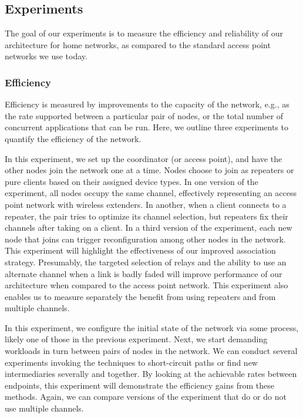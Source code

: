 \subsection{Experiments}
The goal of our experiments is to measure the efficiency and reliability of our architecture for home networks, as compared to the standard access point networks we use today.

\subsubsection{Efficiency}
Efficiency is measured by improvements to the capacity of the network, e.g., as the rate supported between a particular pair of nodes, or the total number of concurrent applications that can be run. Here, we outline three experiments to quantify the efficiency of the network.

 In this experiment, we set up the coordinator (or access point), and have the other nodes join the network one at a time. Nodes choose to join as repeaters or pure clients based on their assigned device types. In one version of the experiment, all nodes occupy the same channel, effectively representing an access point network with wireless extenders. In another, when a client connects to a repeater, the pair tries to optimize its channel selection, but repeaters fix their channels after taking on a client. In a third version of the experiment, each new node that joins can trigger reconfiguration among other nodes in the network. This experiment will highlight the effectiveness of our improved association strategy. Presumably, the targeted selection of relays and the ability to use an alternate channel when a link is badly faded will improve performance of our architecture when compared to the access point network. This experiment also enables us to measure separately the benefit from using repeaters and from multiple channels.

 In this experiment, we configure the initial state of the network via some process, likely one of those in the previous experiment. Next, we start demanding workloads in turn between pairs of nodes in the network. We can conduct several experiments invoking the techniques to short-circuit paths or find new intermediaries severally and together. By looking at the achievable rates between endpoints, this experiment will demonstrate the efficiency gains from these methods. Again, we can compare versions of the experiment that do or do not use multiple channels.

